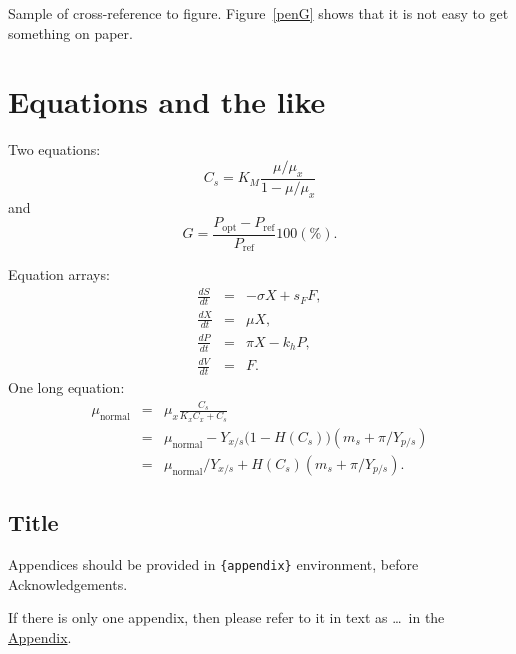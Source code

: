 \documentclass[aoas,preprint]{imsart}
\theoremstyle{remark}
\begin{document}
Sample of cross-reference to figure.
Figure~\ref{penG} shows that it is not easy to get something on paper.

\section{Equations and the like}

Two equations:
\begin{equation}
    C_{s}  =  K_{M} \frac{\mu/\mu_{x}}{1-\mu/\mu_{x}} \label{ccs}
\end{equation}
and
\begin{equation}
    G = \frac{P_{\mathrm{opt}} - P_{\mathrm{ref}}}{P_{\mathrm{ref}}}  100(\%).
\end{equation}

Equation arrays:
\begin{eqnarray}
  \frac{dS}{dt} & = & - \sigma X + s_{F} F,\\
  \frac{dX}{dt} & = &   \mu    X,\\
  \frac{dP}{dt} & = &   \pi    X - k_{h} P,\\
  \frac{dV}{dt} & = &   F.
\end{eqnarray}
One long equation:
\begin{eqnarray}
 \mu_{\text{normal}} & = & \mu_{x} \frac{C_{s}}{K_{x}C_{x}+C_{s}}  \nonumber\\
                     & = & \mu_{\text{normal}} - Y_{x/s}\bigl(1-H(C_{s})\bigr)(m_{s}+\pi /Y_{p/s})\\
                     & = & \mu_{\text{normal}}/Y_{x/s}+ H(C_{s}) (m_{s}+ \pi /Y_{p/s}).\nonumber
\end{eqnarray}
\begin{appendix}
\section*{Title}\label{appn} %
Appendices should be provided in \verb|{appendix}| environment,
before Acknowledgements.

If there is only one appendix,
then please refer to it in text as \ldots\ in the \hyperref[appn]{Appendix}.
\end{appendix}
\end{document}
